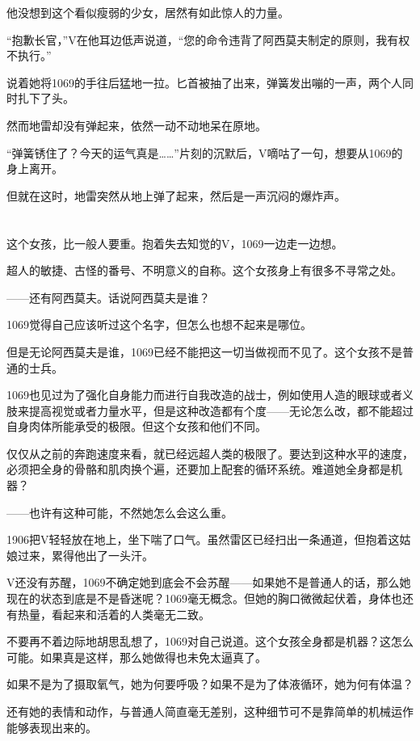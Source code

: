 他没想到这个看似瘦弱的少女，居然有如此惊人的力量。

“抱歉长官，”V在他耳边低声说道，“您的命令违背了阿西莫夫制定的原则，我有权不执行。”

说着她将1069的手往后猛地一拉。匕首被抽了出来，弹簧发出嘣的一声，两个人同时扎下了头。

然而地雷却没有弹起来，依然一动不动地呆在原地。

“弹簧锈住了？今天的运气真是……”片刻的沉默后，V嘀咕了一句，想要从1069的身上离开。

但就在这时，地雷突然从地上弹了起来，然后是一声沉闷的爆炸声。

\section*{}

这个女孩，比一般人要重。抱着失去知觉的V，1069一边走一边想。

超人的敏捷、古怪的番号、不明意义的自称。这个女孩身上有很多不寻常之处。

——还有阿西莫夫。话说阿西莫夫是谁？

1069觉得自己应该听过这个名字，但怎么也想不起来是哪位。

但是无论阿西莫夫是谁，1069已经不能把这一切当做视而不见了。这个女孩不是普通的士兵。

1069也见过为了强化自身能力而进行自我改造的战士，例如使用人造的眼球或者义肢来提高视觉或者力量水平，但是这种改造都有个度——无论怎么改，都不能超过自身肉体所能承受的极限。但这个女孩和他们不同。

仅仅从之前的奔跑速度来看，就已经远超人类的极限了。要达到这种水平的速度，必须把全身的骨骼和肌肉换个遍，还要加上配套的循环系统。难道她全身都是机器？

——也许有这种可能，不然她怎么会这么重。

1906把V轻轻放在地上，坐下喘了口气。虽然雷区已经扫出一条通道，但抱着这姑娘过来，累得他出了一头汗。

V还没有苏醒，1069不确定她到底会不会苏醒——如果她不是普通人的话，那么她现在的状态到底是不是昏迷呢？1069毫无概念。但她的胸口微微起伏着，身体也还有热量，看起来和活着的人类毫无二致。

不要再不着边际地胡思乱想了，1069对自己说道。这个女孩全身都是机器？这怎么可能。如果真是这样，那么她做得也未免太逼真了。

如果不是为了摄取氧气，她为何要呼吸？如果不是为了体液循环，她为何有体温？

还有她的表情和动作，与普通人简直毫无差别，这种细节可不是靠简单的机械运作能够表现出来的。

